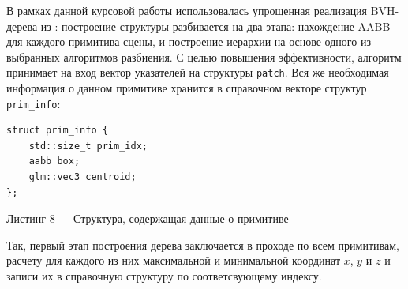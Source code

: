 \documentclass[12pt]{article}
\begin{document}
В рамках данной курсовой работы использовалась упрощенная реализация BVH-дерева из \cite{Pha17}: построение структуры разбивается на два этапа: нахождение AABB для каждого примитива сцены, и построение иерархии на основе одного из выбранных алгоритмов разбиения. С целью повышения эффективности, алгоритм принимает на вход вектор указателей на структуры \texttt{patch}. Вся же необходимая информация о данном примитиве хранится в справочном векторе структур \texttt{prim\_info}:
\begin{lstlisting}
struct prim_info {
    std::size_t prim_idx;
    aabb box;
    glm::vec3 centroid;
};
\end{lstlisting}
\begin{center}Листинг 8 --- Структура, содержащая данные о примитиве \end{center}

Так, первый этап построения дерева заключается в проходе по всем примитивам, расчету для каждого из них максимальной и минимальной координат $x$, $y$ и $z$ и записи их в справочную структуру по соответсвующему индексу.
\end{document}
